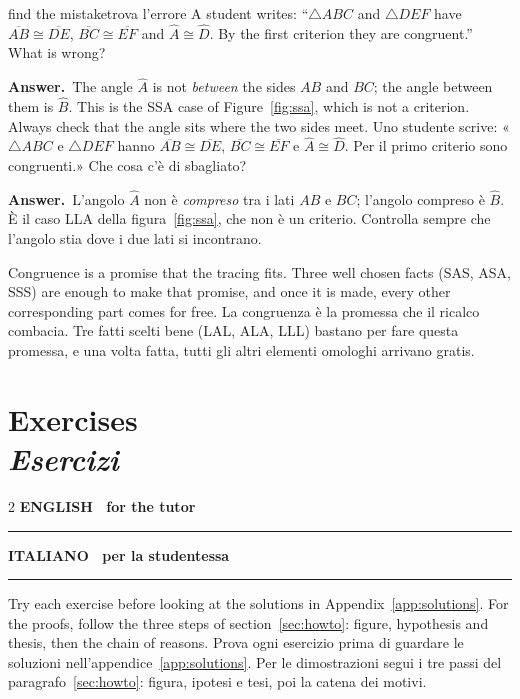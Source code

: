 \documentclass[10pt,a4paper,oneside]{book}
\newif\ifIT
\newenvironment{bi}%
  {\begin{paracol}{2}\global\ITfalse\selectlanguage{english}}%
  {\end{paracol}}
\newcommand{\IT}{\switchcolumn\global\ITtrue\selectlanguage{italian}}
\newcommand{\EN}{\switchcolumn*\global\ITfalse\selectlanguage{english}}
\newcommand{\colheads}{%
  {\small\sffamily\bfseries\color{enblue}ENGLISH \textperiodcentered\ for the tutor}\par\vspace{-2pt}
  {\color{enblue}\rule{\linewidth}{0.8pt}}%
  \IT
  {\small\sffamily\bfseries\color{itgreen}ITALIANO \textperiodcentered\ per la studentessa}\par\vspace{-2pt}
  {\color{itgreen}\rule{\linewidth}{0.8pt}}%
  \EN}
\newcommand{\bichapter}[2]{%
  \chapter[#1 \textperiodcentered\ #2]{#1\\[2pt]{\color{itgreen}\itshape #2}}}
\newcommand{\av}[1]{\widehat{#1}}           %
\newcommand{\seg}[1]{\overline{#1}}         %
\newcommand{\tri}[1]{\triangle #1}          %
\newcommand{\answer}{\par\vspace{2pt}{\color{deeporange}\rule[0.5ex]{\linewidth}{0.4pt}}\par
  {\sffamily\bfseries\small\color{deeporange}\ifIT Risposta\else Answer\fi.}\ }
\begin{document}
\begin{think}{find the mistake}{trova l'errore}
A student writes: ``$\tri{ABC}$ and $\tri{DEF}$ have $\seg{AB} \cong \seg{DE}$, $\seg{BC} \cong \seg{EF}$ and $\av{A} \cong \av{D}$. By the first criterion they are congruent.'' What is wrong?
\answer The angle $\av{A}$ is not \emph{between} the sides $AB$ and $BC$; the angle between them is $\av{B}$. This is the SSA case of Figure~\ref{fig:ssa}, which is not a criterion. Always check that the angle sits where the two sides meet.
\tcblower
Uno studente scrive: «$\tri{ABC}$ e $\tri{DEF}$ hanno $\seg{AB} \cong \seg{DE}$, $\seg{BC} \cong \seg{EF}$ e $\av{A} \cong \av{D}$. Per il primo criterio sono congruenti.» Che cosa c'è di sbagliato?
\answer L'angolo $\av{A}$ non è \emph{compreso} tra i lati $AB$ e $BC$; l'angolo compreso è $\av{B}$. È il caso LLA della figura~\ref{fig:ssa}, che non è un criterio. Controlla sempre che l'angolo stia dove i due lati si incontrano.
\end{think}

\begin{keyidea}{}{}
Congruence is a promise that the tracing fits. Three well chosen facts (SAS, ASA, SSS) are enough to make that promise, and once it is made, every other corresponding part comes for free.
\tcblower
La congruenza è la promessa che il ricalco combacia. Tre fatti scelti bene (LAL, ALA, LLL) bastano per fare questa promessa, e una volta fatta, tutti gli altri elementi omologhi arrivano gratis.
\end{keyidea}


\bichapter{Exercises}{Esercizi}\label{ch:exercises}

\begin{bi}
\colheads
Try each exercise before looking at the solutions in Appendix~\ref{app:solutions}. For the proofs, follow the three steps of section~\ref{sec:howto}: figure, hypothesis and thesis, then the chain of reasons.
\IT
Prova ogni esercizio prima di guardare le soluzioni nell'appendice~\ref{app:solutions}. Per le dimostrazioni segui i tre passi del paragrafo~\ref{sec:howto}: figura, ipotesi e tesi, poi la catena dei motivi.
\end{bi}
\end{document}
